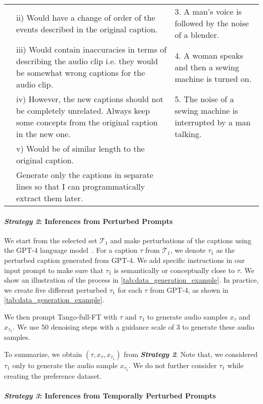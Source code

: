 \begin{table*}[ht!]
{\begin{tabular}{p{5.5cm}|p{8cm}|p{7cm}}
   & ii) Would have a change of order of the events described in the original caption. & 3. A man's voice is followed by the noise of a blender. \\
   & iii) Would contain inaccuracies in terms of describing the audio clip i.e. they would be somewhat wrong captions for the audio clip. & 4. A woman speaks and then a sewing machine is turned on. \\
   & iv) However, the new captions should not be completely unrelated. Always keep some concepts from the original caption in the new one. & 5. The noise of a sewing machine is interrupted by a man talking. \\
   & v) Would be of similar length to the original caption. & \\
   & Generate only the captions in separate lines so that I can programmatically extract them later. & \\
   \bottomrule
   \end{tabular}
   }
  \label{tab:data_generation_example}
\end{table*}
\paragraph{\bf \textit{Strategy 2}: Inferences from Perturbed Prompts} We start from the selected set $\mathcal{T}_1$ and make perturbations of the captions using the GPT-4 language model~\cite{gpt4}. For a caption $\tau$ from $\mathcal{T}_1$, we denote $\tau_1$ as the perturbed caption generated from GPT-4. We add specific instructions in our input prompt to make sure that  $\tau_1$ is semantically or conceptually close to $\tau$. We show an illustration of the process in \cref{tab:data_generation_example}. In practice, we create five different perturbed $\tau_1$ for each $\tau$ from GPT-4, as shown in \cref{tab:data_generation_example}.

We then prompt \textsf{Tango-full-FT} with $\tau$ and $\tau_1$ to generate audio samples $x_{\tau}$ and $x_{\tau_1}$. We use 50 denoising steps with a guidance scale of 3 to generate these audio samples. 

To summarize, we obtain $(\tau, x_{\tau}, x_{\tau_1})$ from \emph{\textbf{Strategy 2}}. Note that, we considered $\tau_1$ only to generate the audio sample $x_{\tau_1}$. We do not further consider $\tau_1$ while creating the preference dataset. 

\paragraph{\bf \textit{Strategy 3}: Inferences from Temporally Perturbed Prompts}

